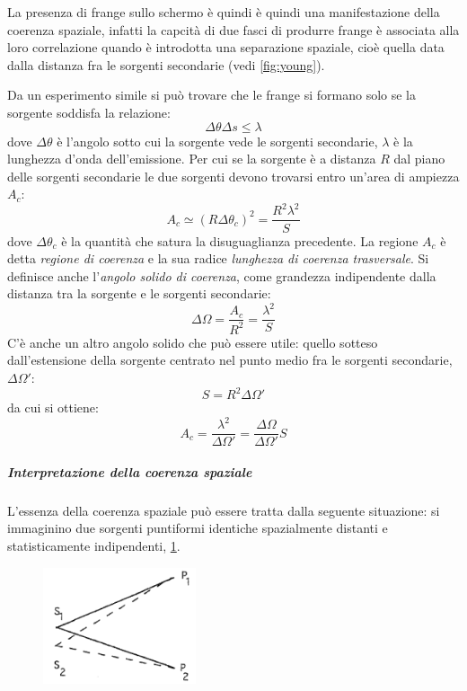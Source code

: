 La presenza di frange sullo schermo è quindi è quindi una manifestazione della coerenza spaziale, infatti la capcità di due fasci di produrre frange è associata alla loro correlazione quando è introdotta una separazione spaziale, cioè quella data dalla distanza fra le sorgenti secondarie (vedi \cref{fig:young}).

Da un esperimento simile si può trovare che le frange si formano solo se la sorgente soddisfa la relazione:
\[ \Delta \theta \Delta s \leq \lambda \]
dove $ \Delta\theta $ è l'angolo sotto cui la sorgente vede le sorgenti secondarie, $ \lambda $ è la lunghezza d'onda dell'emissione. Per cui se la sorgente è a distanza $ R $ dal piano delle sorgenti secondarie le due sorgenti devono trovarsi entro un'area di ampiezza $ A_c $:
\[ A_c \simeq (R\Delta\theta_c)^2 = \frac{R^2\lambda^2}{S} \]
dove $ \Delta\theta_c $ è la quantità che satura la disuguaglianza precedente. La regione $ A_c $ è detta \textit{regione di coerenza} e la sua radice \textit{lunghezza di coerenza trasversale}. Si definisce anche l'\textit{angolo solido di coerenza}, come grandezza indipendente dalla distanza tra la sorgente e le sorgenti secondarie:
\[ \Delta\Omega = \frac{A_c}{R^2} = \frac{\lambda^2}{S} \]
C'è anche un altro angolo solido che può essere utile: quello sotteso dall'estensione della sorgente centrato nel punto medio fra le sorgenti secondarie, $ \Delta\Omega' $:
\[ S =  R^2 \Delta\Omega'\]
da cui si ottiene:
\[ A_c = \frac{\lambda^2}{\Delta\Omega'} = \frac{\Delta\Omega}{\Delta\Omega'} S\]

 \subparagraph{Interpretazione della coerenza spaziale} L'essenza della coerenza spaziale può essere tratta dalla seguente situazione: si immaginino due sorgenti puntiformi identiche spazialmente distanti e statisticamente indipendenti, \cref{fig:spcoh}.

\begin{figure}[h]
	\centering
	\includegraphics[width=0.4\textwidth]{Immagini/Spatialcoh.png}
	\vspace{-10pt}
	\caption{}
	\label{fig:spcoh}
	\vspace{-10pt}
\end{figure}

